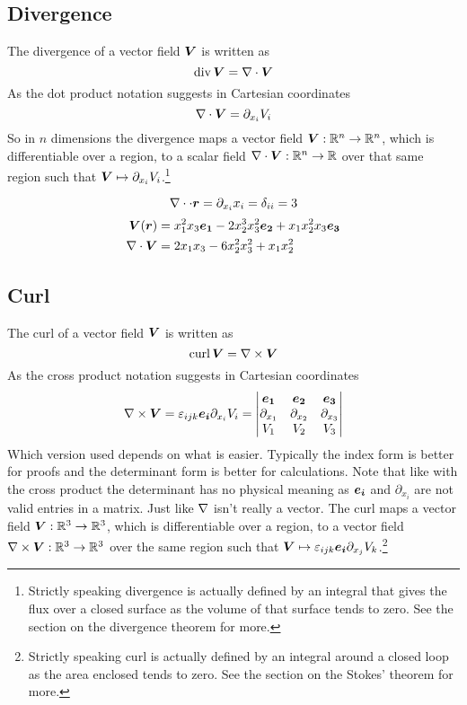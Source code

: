\documentclass{article}
\newcommand{\pdvx}[1]{\partial_{x_{#1}}}
\begin{document}
    \subsection{Divergence}
    The divergence of a vector field \(\bm{V}\) is written as
    \[\mathop{\mathrm{div}}\bm{V} = \nabla\cdot\bm{V}\]
    As the dot product notation suggests in Cartesian coordinates
    \[\div \vv V = \pdvx i V_i\]
    So in \(n\) dimensions the divergence maps a vector field \(\bm{V}:\mathbb{R}^n\to\mathbb{R}^n\), which is differentiable over a region, to a scalar field \(\nabla\cdot\bm{V}:\mathbb{R}^n\to\mathbb{R}\) over that same region such that \(\vv V\mapsto \pdvx i V_i\).\footnote{Strictly speaking divergence is actually defined by an integral that gives the flux over a closed surface as the volume of that surface tends to zero. See the section on the divergence theorem for more.}
    
    \example
    \[\div\cdot\vv r = \pdvx ix_i = \delta_{ii} = 3\]
    \begin{align*}
        \bm{V}(\bm{r}) &= x_1^2x_3\bm{e_{1}} - 2x_2^3x_3^2\bm{e_{2}} + x_1x_2^2x_3\bm{e_{3}}\\
        \nabla\cdot\bm{V} &= 2x_1x_3 - 6x_2^2x_3^2 + x_1x_2^2
    \end{align*}
    
    \subsection{Curl}
    The curl of a vector field \(\bm{V}\) is written as
    \[\mathop{\mathrm{curl}}\bm{V} = \nabla\times\bm{V}\]
    As the cross product notation suggests in Cartesian coordinates
    \[
        \curl\vv V = \varepsilon_{ijk}\ve i\pdvx iV_i = 
        \begin{vmatrix}
           \ve 1 & \ve 2 & \ve 3\\
           \pdvx 1 & \pdvx 2 & \pdvx 3\\
           V_1 & V_2 & V_3 
        \end{vmatrix}
    \]
    Which version used depends on what is easier.
    Typically the index form is better for proofs and the determinant form is better for calculations.
    Note that like with the cross product the determinant has no physical meaning as \(\bm{e_{i}}\) and \(\pdvx i\) are not valid entries in a matrix.
    Just like \(\nabla\) isn't really a vector.
    The curl maps a vector field \(\bm{V}:\mathbb{R}^3 \to \mathbb{R}^3\), which is differentiable over a region, to a vector field \(\nabla\times\bm{V}:\mathbb{R}^3 \to \mathbb{R}^3\) over the same region such that \(\vv V \mapsto \varepsilon_{ijk}\ve i\pdvx j V_k\).\footnote{Strictly speaking curl is actually defined by an integral around a closed loop as the area enclosed tends to zero. See the section on the Stokes' theorem for more.}
    
\end{document}
